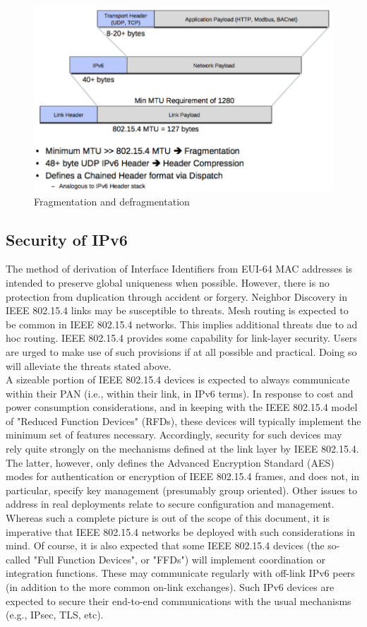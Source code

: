 \begin{figure}[ht]
	\centering
	\includegraphics[scale=0.51]{images/headercompression.png}
	\caption{Fragmentation and defragmentation}
\end{figure}
\subsection{Security of IPv6}
The method of derivation of Interface Identifiers from EUI-64 MAC addresses is intended to preserve global uniqueness when possible. However, there is no protection from duplication through accident or forgery. Neighbor Discovery in IEEE 802.15.4 links may be susceptible to threats.  Mesh routing is expected to be common in IEEE 802.15.4 networks. This implies additional threats due to ad hoc routing.  IEEE 802.15.4 provides some capability for link-layer security. Users are urged to make use of such provisions if at all possible and practical.  Doing so will alleviate the threats stated above. \\A sizeable portion of IEEE 802.15.4 devices is expected to always communicate within their PAN (i.e., within their link, in IPv6 terms).  In response to cost and power consumption considerations, and in keeping with the IEEE 802.15.4 model of "Reduced Function Devices" (RFDs), these devices will typically implement the minimum set of features necessary.  Accordingly, security for such devices may rely quite strongly on the mechanisms defined at the link layer by IEEE 802.15.4.  The latter, however, only defines the Advanced Encryption Standard (AES) modes for authentication or encryption of IEEE 802.15.4 frames, and does not, in particular, specify key management (presumably group oriented).  Other issues to address in real deployments relate to secure configuration and management. Whereas such a complete picture is out of the scope of this document, it is imperative that IEEE 802.15.4 networks be deployed with such  considerations in mind.  Of course, it is also expected that some IEEE 802.15.4 devices (the so-called "Full Function Devices", or "FFDs") will implement coordination or integration functions.  These may communicate regularly with off-link IPv6 peers (in addition to the more common on-link exchanges).  Such IPv6 devices are expected to secure their end-to-end communications with the usual mechanisms (e.g., IPsec, TLS, etc).
